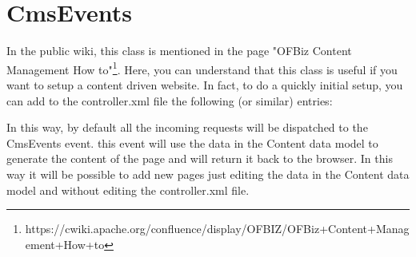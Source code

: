 \section{CmsEvents}

In the public wiki, this class is mentioned in the page "OFBiz Content Management How to"\footnote{https://cwiki.apache.org/confluence/display/OFBIZ/OFBiz+Content+Management+How+to}. Here, you can understand that this class is useful if you want to setup a content driven website. In fact, to do a quickly initial setup, you can add to the controller.xml file the following (or similar) entries:

    
    
In this way, by default all the incoming requests will be dispatched to the CmsEvents event. this event will use the data in the Content data model to generate the content of the page and will return it back to the browser. In this way it will be possible to add new pages just editing the data in the Content data model and without editing the controller.xml file.